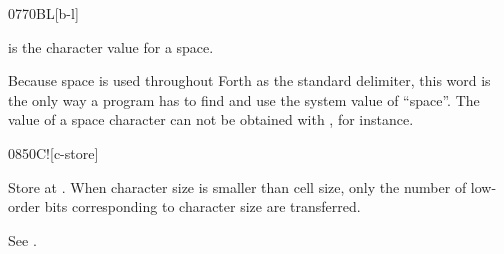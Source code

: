 \begin{worddef}{0770}{BL}[b-l]
\item {}

	 is the character value for a space.

	\begin{rationale} %
		Because space is used throughout Forth as the standard
		delimiter, this word is the only way a program has to find and
		use the system value of ``space''. The value of a space
		character can not be obtained with , for instance.
	\end{rationale}

	\begin{testing} %
	\end{testing}
\end{worddef}


\begin{worddef}{0850}{C!}[c-store]
\item {}

	Store  at . When character size is smaller
	than cell size, only the number of low-order bits corresponding to
	character size are transferred.


	\begin{testing} %
		See .
	\end{testing}
\end{worddef}


